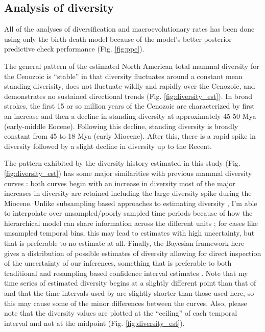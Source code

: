 \documentclass[12pt,letterpaper]{article}
\begin{document}
\subsection*{Analysis of diversity}

All of the analyses of diversification and macroevolutionary rates has been done using only the birth-death model because of the model's better posterior predictive check performance (Fig. \ref{fig:ppc}).


The general pattern of the estimated North American total mammal diversity for the Cenozoic is ``stable'' in that diversity fluctuates around a constant mean standing diverisity, does not fluctuate wildly and rapidly over the Cenozoic, and demonstrates no sustained directional trends (Fig. \ref{fig:diversity_est}). In broad strokes, the first 15 or so million years of the Cenozoic are characterized by first an increase and then a decline in standing diversity at approximately 45-50 Mya (early-middle Eocene). Following this decline, standing diversity is broadly constant from 45 to 18 Mya (early Miocene). After this, there is a rapid spike in diversity followed by a slight decline in diversity up to the Recent. 

The pattern exhibited by the diversity history estimated in this study (Fig. \ref{fig:diversity_est}) has some major similarities with previous mammal diversity curves \citep{Alroy2009}: both curves begin with an increase in diversity most of the major increases in diversity are retained including the large diversity spike during the Miocene. Unlike subsampling based approaches to estimating diversity \citep{Alroy2010c}, I'm able to interpolate over unsampled/poorly sampled time periods because of how the hierarchical model can share information across the different units \cite{Gelman2013d}; for cases like unsampled temporal bins, this may lead to estimates with high uncertainty, but that is preferable to no estimate at all. Finally, the Bayesian framework here gives a distribution of possible estimates of diversity allowing for direct inspection of the uncertainty of our inferences, something that is preferable to both traditional and resampling based confidence interval estimates \citep{Gelman2013d}. Note that my time series of estimated diversity begins at a slightly different point than that of \citet{Alroy2009} and that the time intervals used by \citet{Alroy2009} are slightly shorter than those used here, so this may cause some of the minor differences between the curves. Also, please note that the diversity values are plotted at the ``ceiling'' of each temporal interval and not at the midpoint (Fig. \ref{fig:diversity_est}).
\end{document}
